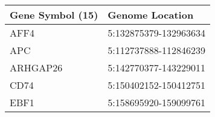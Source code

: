 \begin{tabular}{ll}
\toprule
Gene Symbol (15) &       Genome Location \\
\midrule
            AFF4 & 5:132875379-132963634 \\
             APC & 5:112737888-112846239 \\
        ARHGAP26 & 5:142770377-143229011 \\
            CD74 & 5:150402152-150412751 \\
            EBF1 & 5:158695920-159099761 \\
\bottomrule
\end{tabular}
